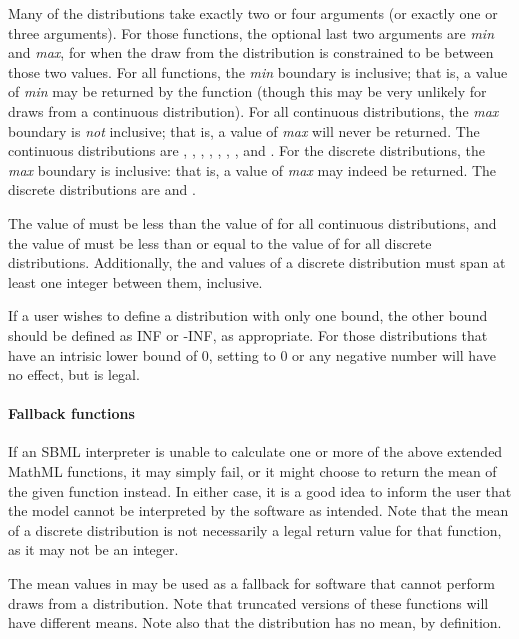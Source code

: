 \documentclass[draftspec]{sbmlpkgspec}
\newcommand{\mathml}{MathML\xspace}
\begin{document}
Many of the distributions take exactly two or four arguments (or exactly one or three arguments).  For those functions, the optional last two arguments are \textit{min} and \textit{max}, for when the draw from the distribution is constrained to be between those two values.  For all functions, the \textit{min} boundary is inclusive; that is, a value of \textit{min} may be returned by the function (though this may be very unlikely for draws from a continuous distribution).  For all continuous distributions, the \textit{max} boundary is \emph{not} inclusive; that is, a value of \textit{max} will never be returned.  The continuous distributions are , , , , , , , and .  For the discrete distributions, the \textit{max} boundary is inclusive: that is, a value of \textit{max} may indeed be returned.  The discrete distributions are  and .

The value of  must be less than the value of  for all continuous distributions, and the value of  must be less than or equal to the value of  for all discrete distributions.  Additionally, the  and  values of a discrete distribution must span at least one integer between them, inclusive.

If a user wishes to define a distribution with only one bound, the other bound should be defined as INF or -INF, as appropriate.  For those distributions that have an intrisic lower bound of 0, setting  to 0 or any negative number will have no effect, but is legal.

\paragraph{Fallback functions}

If an SBML interpreter is unable to calculate one or more of the above extended \mathml functions, it may simply fail, or it might choose to return the mean of the given function instead.  In either case, it is a good idea to inform the user that the model cannot be interpreted by the software as intended. Note that the mean of a discrete distribution is not necessarily a legal return value for that function, as it may not be an integer.

The mean values in  may be used as a fallback for software that cannot perform draws from a distribution.  Note that truncated versions of these functions will have different means.  Note also that the  distribution has no mean, by definition.
\end{document}
